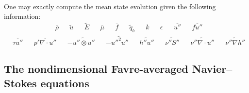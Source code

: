 \documentclass[letterpaper,11pt,nointlimits,reqno]{amsart}
\begin{document}
One may exactly compute the mean state evolution given the following information:
\begin{align}
&\bar{\rho}
&
&\tilde{u}
&
&\tilde{E}
&
&\bar{\mu}
&
&\bar{f}
&
&\tilde{q}_b
&
&k
&
&\epsilon
&
&\overline{u''}
&
&\overline{fu''}
\end{align}
\begin{align}
&\overline{\tau{}u''}
&
&\overline{p'\nabla\cdot{}u''}
&
&-\widetilde{u''\otimes{}u''}
&
&-\widetilde{{u''}^{2}u''}
&
&\widetilde{h''u''}
&
&\widetilde{\nu''S''}
&
&\widetilde{\nu''\nabla\cdot{}u''}
&
&\widetilde{\nu''\nabla{}h''}
\end{align}

\subsection{The nondimensional Favre-averaged Navier--Stokes equations}
\end{document}
